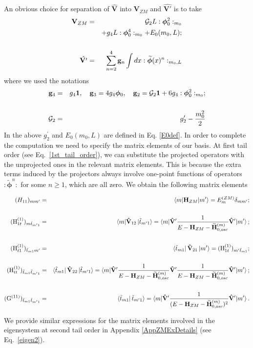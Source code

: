 \documentclass[twocolumn,secnumarabic,amssymb, nobibnotes, aps, prd]{revtex4-2}
\newcommand{\bea}{\begin{eqnarray}}
\newcommand{\eea}{\end{eqnarray}}
\begin{document}
An obvious choice for separation of $\hat{\mathbf{V}}$ into $\mathbf{V}_{ZM}$ and $\hat{\mathbf{V'}}$ is to take 
\bea
\mathbf{V}_{ZM} &=&\mathcal{G}_2L :\boldsymbol{\phi}_0^2:_{m_0}\nonumber \\
& &+g_4 L :\boldsymbol{\phi}_0^4:_{m_0}+E_0(m_0,L);\label{VZMOrigChoice}\cr\cr
\hat{\mathbf{ V'}} &=& \sum_{n=2}^4\mathbf{g}_n\intop dx  :\widetilde{\boldsymbol{\phi}}(x)^n:_{m_0,L} 
 \label{V1OrigChoice}
\eea
where we used the notations
\bea
\mathbf{g}_4&=&g_4\mathbf{1},\quad\mathbf{g}_3=4g_4 \boldsymbol{\phi}_0,\quad \mathbf{g}_2=\mathcal{G}_2\mathbf{1}+6g_4 :\boldsymbol{\phi}_0^2:_{m_0};\cr\cr
\mathcal{G}_2&=&g_2^\prime-\frac{m_0^2}{2}\label{boldgdef}
\eea
In the above $g^\prime_2$ and  $E_0(m_0,L)$ are
defined in Eq. \eqref{E0def}. 
In order to complete the computation we need to specify the matrix elements of our basis.  At first tail order (see Eq.~\ref{1st_tail_order}), we can substitute the projected operators with the unprojected ones in the relevant matrix elements. 
This is because the extra terms induced by the projectors always involve one-point functions of operators $:\widetilde{\boldsymbol{\phi}}^n:$ for some $n\geq1$, which are all zero. We obtain the following matrix elements  
\begin{widetext}
    \begin{eqnarray}\label{1st_tail_mes}
        (H_{11})_{mm'} &=& \langle m | \mathbf{H}_{ZM} | m'\rangle =E_m^{(ZM)} \delta_{mm^\prime};\cr\cr
        ({\rm H}_{1t}^{(1)})_{m\tilde t_{m'1}} &=& \langle m |\mathbf{\hat V}_{12}   \ket{\tilde t_{m'1}} = \braket{m|\mathbf{\hat V'}\frac{1}{E-\mathbf H_{ZM}- \widetilde{\mathbf{H}}_{0,osc}^{(m)}}\mathbf{\hat V'}|m'} ;\cr\cr
        ({\rm H}_{t1}^{(1)})_{\tilde t_{m1}m'} &=& \bra{\tilde t_{m1}}\mathbf{\hat V}_{21} \ket{m'} = ({\rm H}_{1t}^{(1)})_{m'\tilde t_{m1}};\cr\cr
        ({\rm H}_{tt}^{(1)})_{\tilde t_{m1} \tilde t_{m'1}} &=& \bra{\tilde t_{m1}}\mathbf{\hat V}_{22} \ket{\tilde t_{m'1}} = \braket{m|\mathbf{\hat V'}\frac{1}{E-\mathbf H_{ZM}- \widetilde{\mathbf{H}}_{0,osc}^{(m)}}\mathbf{\hat V'}\frac{1}{E-\mathbf H_{ZM}- \widetilde{\mathbf{H}}_{0,osc}^{(m)}}\mathbf{\hat V'}|m'};\cr\cr
        ({\rm G}^{(11)})_{\tilde t_{m1} \tilde t_{m'1}} &=& \bra{\tilde t_{m1}} \tilde t_{m'1}\rangle = \braket{m|\mathbf{\hat V'}\frac{1}{(E-\mathbf H_{ZM}- \widetilde{\mathbf{H}}_{0,osc}^{(m)})^2}\mathbf{\hat V'}|m'}.
    \end{eqnarray}
\end{widetext}
 We provide similar expressions for the matrix elements involved in the eigensystem at second tail order in Appendix \ref{AppZMExDetails} (see Eq.~\ref{eigen2}). 
\end{document}
